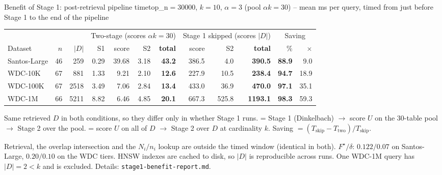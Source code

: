 
\begin{frame}{Benefit of Stage 1: post-retrieval pipeline time}{top\_n$=30000$, $k{=}10$, $\alpha{=}3$ (pool $\alpha k{=}30$) -- mean ms per query, timed from just before Stage 1 to the end of the pipeline}
\footnotesize
\begin{center}
\setlength{\tabcolsep}{3pt}
\begin{tabular}{lrr rrrr rrr rr}
\toprule
& & & \multicolumn{4}{c}{Two-stage (scores $\alpha k{=}30$)} & \multicolumn{3}{c}{Stage 1 skipped (scores $|D|$)} & \multicolumn{2}{c}{Saving} \\
\cmidrule(lr){4-7}\cmidrule(lr){8-10}\cmidrule(lr){11-12}
Dataset & $n$ & $|D|$ & S1 & score & S2 & \textbf{total} & score & S2 & \textbf{total} & \% & $\times$ \\
\midrule
Santos-Large & 46 & 259 & 0.29 & 39.68 & 3.18 & \textbf{43.2} & 386.5 & 4.0 & \textbf{390.5} & \textbf{88.9} & 9.0 \\
WDC-10K & 67 & 881 & 1.33 & 9.21 & 2.10 & \textbf{12.6} & 227.9 & 10.5 & \textbf{238.4} & \textbf{94.7} & 18.9 \\
WDC-100K & 67 & 2518 & 3.49 & 7.06 & 2.84 & \textbf{13.4} & 433.0 & 36.9 & \textbf{470.0} & \textbf{97.1} & 35.1 \\
WDC-1M & 66 & 5211 & 8.82 & 6.46 & 4.85 & \textbf{20.1} & 667.3 & 525.8 & \textbf{1193.1} & \textbf{98.3} & 59.3 \\
\bottomrule
\end{tabular}
\end{center}
\vspace{3pt}
\footnotesize
Same retrieved $D$ in both conditions, so they differ only in whether Stage 1 runs.  = Stage 1 (Dinkelbach) $\to$ score $U$ on the 30-table pool $\to$ Stage 2 over the pool.  = score $U$ on all of $D$ $\to$ Stage 2 over $D$ at cardinality $k$. Saving $=(T_{\text{skip}}-T_{\text{two}})/T_{\text{skip}}$.

\vspace{1pt}
{\footnotesize\color{Muted} Retrieval, the overlap intersection and the $N_i/n_i$ lookup are outside the timed window (identical in both). $F^\star/\delta$: $0.122/0.07$ on Santos-Large, $0.20/0.10$ on the WDC tiers. HNSW indexes are cached to disk, so $|D|$ is reproducible across runs. One WDC-1M query has $|D|{=}2<k$ and is excluded. Details: \texttt{stage1-benefit-report.md}.}
\end{frame}

